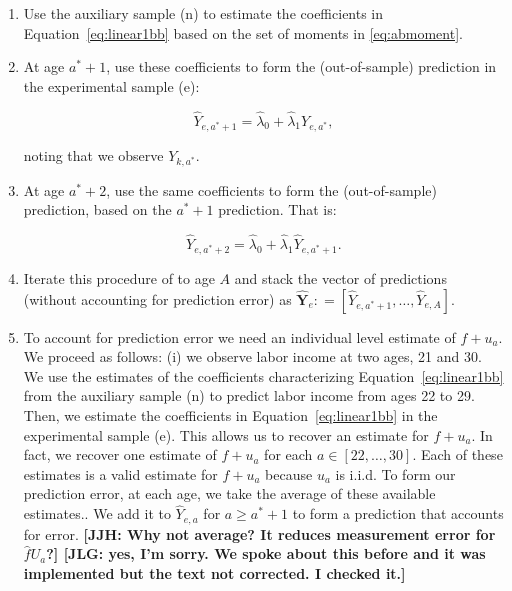 \begin{enumerate}
\item Use the auxiliary sample (n) to estimate the coefficients in Equation~\eqref{eq:linear1bb} based on the set of moments in \eqref{eq:abmoment}.
\item At age $a^*+1$, use these coefficients to form the (out-of-sample) prediction in the experimental sample (e):

\begin{equation}
\hat{Y}_{e,a^* + 1} = \hat{\lambda}_{0} + \hat{\lambda}_{1} Y_{e,a^*},
\end{equation}

\noindent noting that we observe $Y_{k,a^*}$.

\item At age $a^*+2$, use the same coefficients to form the (out-of-sample) prediction, based on the $a^*+1$ prediction. That is:

\begin{equation}
\hat{Y}_{e,a^* + 2} = \hat{\lambda}_{0} + \hat{\lambda}_{1} \hat{Y}_{e,a^*+1}.
\end{equation}

\item Iterate this procedure of to age $A$ and stack the vector of predictions (without accounting for prediction error) as $\hat{\bm{Y}}_{e} : = \left[ \hat{Y}_{e,a^*+1}, \ldots,  \hat{Y}_{e,A} \right]$.

\item To account for prediction error we need an individual level estimate of $f + u_{a}$. We proceed as follows: (i) we observe labor income at two ages, 21 and 30. We use the estimates of the coefficients characterizing Equation~\eqref{eq:linear1bb} from the auxiliary sample (n) to predict labor income from ages 22 to 29. Then, we estimate the coefficients in Equation~\eqref{eq:linear1bb} in the experimental sample (e). This allows us to recover an estimate for $f + u_{a}$. In fact, we recover one estimate of $f + u_{a}$ for each $a \in \left[22, \ldots, 30 \right]$. Each of these estimates is a valid estimate for $f + u_{a}$ because $u_{a}$ is i.i.d. To form our prediction error, at each age, we take the average of these available estimates.. We add it to  $\hat{Y}_{e,a}$ for $a \geq a^* + 1$ to form a prediction that accounts for error. \textbf{[JJH: Why not average? It reduces measurement error for $\hat{f} U_a$?] [JLG: yes, I'm sorry. We spoke about this before and it was implemented but the text not corrected. I checked it.]}
\end{enumerate}


